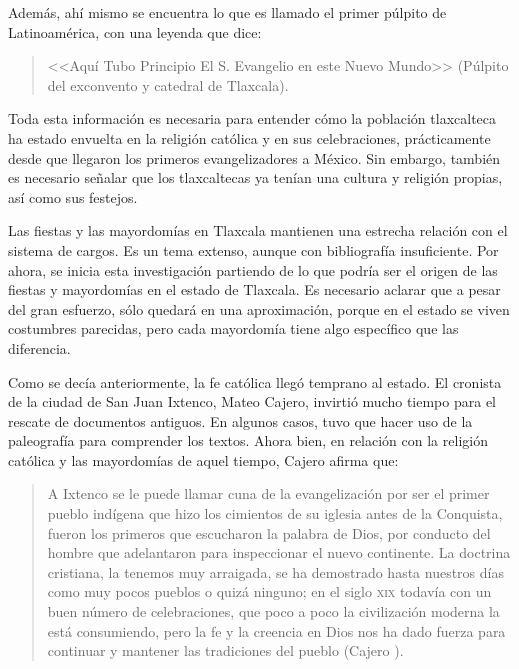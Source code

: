\documentclass[14pt,letterpaper,twoside]{extbook} %
\begin{document}
\noindent Además, ahí mismo se encuentra lo que es llamado el primer púlpito de Latinoamérica, con una leyenda que dice: 

\begin{quotation}
\noindent <<Aquí Tubo Principio El S. Evangelio en este Nuevo Mundo>> (Púlpito del exconvento y catedral de Tlaxcala).
\end{quotation}

\noindent Toda esta información es necesaria para entender cómo la población tlaxcalteca ha estado envuelta en la religión católica y en sus celebraciones, prácticamente desde que llegaron los primeros evangelizadores a México. Sin embargo, también es necesario señalar que los tlaxcaltecas ya tenían una cultura y religión propias, así como sus festejos.

Las fiestas y las mayordomías en Tlaxcala mantienen una estrecha relación con el sistema de cargos. Es un tema extenso, aunque con bibliografía insuficiente. Por ahora, se inicia esta investigación partiendo de lo que podría ser el origen de las fiestas y mayordomías en el estado de Tlaxcala. Es necesario aclarar que a pesar del gran esfuerzo, sólo quedará en una aproximación, porque en el estado se viven costumbres parecidas, pero cada mayordomía tiene algo específico que las diferencia.

Como se decía anteriormente, la fe católica llegó temprano al estado. El cronista de la ciudad de San Juan Ixtenco, Mateo Cajero, invirtió mucho tiempo para el rescate de documentos antiguos. En algunos casos, tuvo que hacer uso de la paleografía para comprender los textos. Ahora bien, en relación con la religión católica y las mayordomías de aquel tiempo, Cajero afirma que:

\begin{quotation}
\noindent A Ixtenco se le puede llamar cuna de la evangelización por ser el primer pueblo indígena que hizo los cimientos de su iglesia antes de la Conquista, fueron los primeros que escucharon la palabra de Dios, por conducto del hombre que adelantaron para inspeccionar el nuevo continente. La doctrina cristiana, la tenemos muy arraigada, se ha demostrado hasta nuestros días como muy pocos pueblos o quizá ninguno; en el siglo \textsc{xix} todavía con un buen número de celebraciones, que poco a poco la civilización moderna la está consumiendo, pero la fe y la creencia en Dios nos ha dado fuerza para continuar y mantener las tradiciones del pueblo (Cajero ).
\end{quotation}
\end{document}
